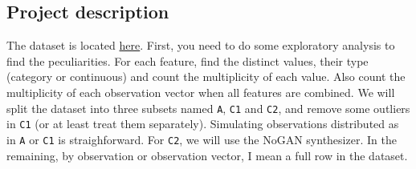 \documentclass[oneside,10pt]{book}
\begin{document}
\subsection{Project description}

The dataset is located \href{https://raw.githubusercontent.com/VincentGranville/Main/main/iot_security.csv}{here}.
 First, you need to do some exploratory analysis to find the peculiarities. For each feature, find the distinct values, their type (category or continuous) and count the multiplicity of each value. Also count the multiplicity of each observation vector when all features
 are combined. We will split the dataset into three subsets named \texttt{A}, \texttt{C1} and \texttt{C2}, 
and remove some outliers in \texttt{C1} (or at least treat them separately). Simulating observations distributed as in 
\texttt{A} or \texttt{C1} is straighforward.
 For \texttt{C2}, we will use the NoGAN synthesizer. In the remaining, by observation or observation vector, I mean a full row in the dataset. 
\end{document}

